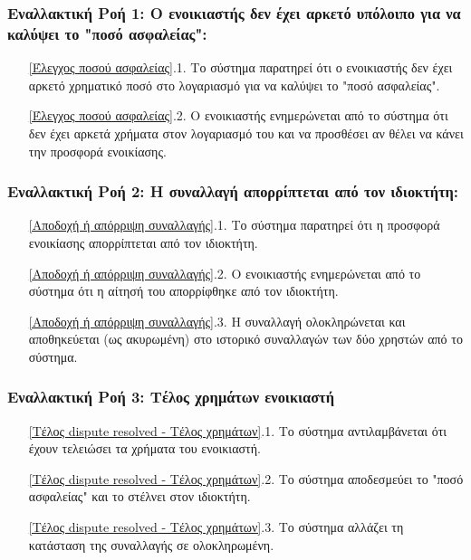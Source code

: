 \documentclass[12pt,a4paper]{article}
\begin{document}
\subsubsection*{Εναλλακτική Ροή 1: Ο ενοικιαστής δεν έχει αρκετό υπόλοιπο για να καλύψει το "ποσό ασφαλείας":}
\begin{enumerate}
    \item[\ref{Έλεγχος ποσού ασφαλείας}.1.] Το σύστημα παρατηρεί ότι ο ενοικιαστής δεν έχει αρκετό χρηματικό ποσό στο λογαριασμό για να καλύψει το "ποσό ασφαλείας".
    \item[\ref{Έλεγχος ποσού ασφαλείας}.2.] Ο ενοικιαστής ενημερώνεται από το σύστημα ότι δεν έχει αρκετά χρήματα στον λογαριασμό του και να προσθέσει αν θέλει να κάνει την προσφορά ενοικίασης.
\end{enumerate}

\subsubsection*{Εναλλακτική Ροή 2: Η συναλλαγή απορρίπτεται από τον ιδιοκτήτη:}
\begin{enumerate}
    \item[\ref{Αποδοχή ή απόρριψη συναλλαγής}.1.] Το σύστημα παρατηρεί ότι η προσφορά ενοικίασης απορρίπτεται από τον ιδιοκτήτη.
    \item[\ref{Αποδοχή ή απόρριψη συναλλαγής}.2.] Ο ενοικιαστής ενημερώνεται από το σύστημα ότι η αίτησή του απορρίφθηκε από τον ιδιοκτήτη.
    \item[\ref{Αποδοχή ή απόρριψη συναλλαγής}.3.] Η συναλλαγή ολοκληρώνεται και αποθηκεύεται (ως ακυρωμένη) στο ιστορικό συναλλαγών των δύο χρηστών από το σύστημα.
\end{enumerate}

\subsubsection*{Εναλλακτική Ροή 3: Τέλος χρημάτων ενοικιαστή}
\begin{enumerate}
    \item[\ref{Τέλος dispute resolved - Τέλος χρημάτων}.1.] Το σύστημα αντιλαμβάνεται ότι έχουν τελειώσει τα χρήματα του ενοικιαστή.
    \item[\ref{Τέλος dispute resolved - Τέλος χρημάτων}.2.] Το σύστημα αποδεσμεύει το "ποσό ασφαλείας" και το στέλνει στον ιδιοκτήτη.
    \item[\ref{Τέλος dispute resolved - Τέλος χρημάτων}.3.] Το σύστημα αλλάζει τη κατάσταση της συναλλαγής σε ολοκληρωμένη.
\end{enumerate}
\end{document}
